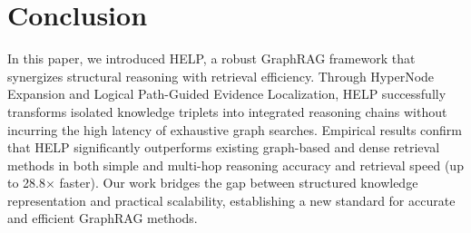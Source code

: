 \section{Conclusion}
In this paper, we introduced HELP, a robust GraphRAG framework that synergizes structural reasoning with retrieval efficiency. Through HyperNode Expansion and Logical Path-Guided Evidence Localization, HELP successfully transforms isolated knowledge triplets into integrated reasoning chains without incurring the high latency of exhaustive graph searches. Empirical results confirm that HELP significantly outperforms existing graph-based and dense retrieval methods in both simple and multi-hop reasoning accuracy and retrieval speed (up to 28.8$\times$ faster). Our work bridges the gap between structured knowledge representation and practical scalability, establishing a new standard for accurate and efficient GraphRAG methods.
